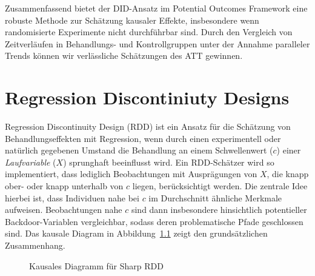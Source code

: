\documentclass[
  a4paper,
  DIV=11,
  oneside]{scrreprt}
\begin{document}
Zusammenfassend bietet der DID-Ansatz im Potential Outcomes Framework
eine robuste Methode zur Schätzung kausaler Effekte, insbesondere wenn
randomisierte Experimente nicht durchführbar sind. Durch den Vergleich
von Zeitverläufen in Behandlungs- und Kontrollgruppen unter der Annahme
paralleler Trends können wir verlässliche Schätzungen des ATT gewinnen.


\chapter{Regression Discontiniuty
Designs}\label{regression-discontiniuty-designs}

Regression Discontinuity Design (RDD) ist ein Ansatz für die Schätzung
von Behandlungseffekten mit Regression, wenn durch einen experimentell
oder natürlich gegebenen Umstand die Behandlung an einem Schwellenwert
(\(c\)) einer \emph{Laufvariable} (\(X\)) sprunghaft beeinflusst wird.
Ein RDD-Schätzer wird so implementiert, dass lediglich Beobachtungen mit
Ausprägungen von \(X\), die knapp ober- oder knapp unterhalb von \(c\)
liegen, berücksichtigt werden. Die zentrale Idee hierbei ist, dass
Individuen nahe bei \(c\) im Durchschnitt ähnliche Merkmale aufweisen.
Beobachtungen nahe \(c\) sind dann insbesondere hinsichtlich
potentieller Backdoor-Variablen vergleichbar, sodass deren
problematische Pfade geschlossen sind. Das kausale Diagram in
Abbildung~\ref{fig-CDRDD} zeigt den grundsätzlichen Zusammenhang.

\begin{figure}[t]


\caption{\label{fig-CDRDD}Kausales Diagramm für Sharp RDD}

\end{figure}%
\end{document}
